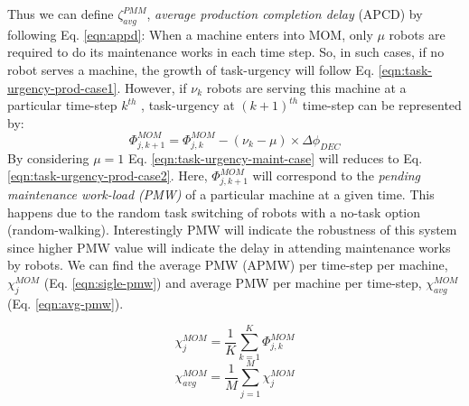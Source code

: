 \documentclass[smallcondensed]{svjour3}
\begin{document}
Thus we can define $\zeta_{avg}^{PMM}$, {\em average production completion delay} (APCD) by following Eq. \ref{eqn:appd}:
When a machine enters into MOM, only $\mu$ robots are required to do its maintenance works in each time step. So, in such cases, if no robot serves a machine, the growth of task-urgency will follow Eq. \ref{eqn:task-urgency-prod-case1}. However, if $\nu_{k}$ robots are serving this machine at a particular time-step $k^{th}$ , task-urgency at $(k+1)^{th}$ time-step can be represented by:
\begin{equation}
\Phi_{j, k+1}^{MOM} = \Phi_{j, k}^{MOM}- (\nu_{k} - \mu) \times \Delta \phi_{DEC}
\label{eqn:task-urgency-maint-case}
\end{equation}
By considering $\mu = 1$ Eq. \ref{eqn:task-urgency-maint-case} will reduces to Eq. \ref{eqn:task-urgency-prod-case2}. Here, $\Phi_{j, k+1}^{MOM}$ will correspond to the {\em pending maintenance work-load (PMW)} of a particular machine at a given time. This happens due to the random task switching of robots with a no-task option (random-walking). Interestingly PMW will indicate the robustness of this system since higher PMW value will indicate the delay in attending maintenance works by robots. We can find the average PMW (APMW) per time-step per machine, $\chi_{j}^{MOM}$ (Eq. \ref{eqn:sigle-pmw}) and average PMW per machine per time-step, $\chi_{avg}^{MOM}$ (Eq. \ref{eqn:avg-pmw}).
\begin{multicols}{2}
\small
\begin{equation}
\chi_{j}^{MOM}= \frac{1}{K} \sum_{k=1}^{K} \Phi_{j, k}^{MOM}
\label{eqn:sigle-pmw}
\end{equation}
\vspace*{0.2cm}
\begin{equation}
\chi_{avg}^{MOM}= \frac{1}{M} \sum_{j=1}^{M} {\chi_{j}^{MOM}}
\label{eqn:avg-pmw}
\end{equation}
\end{multicols}
\end{document}
